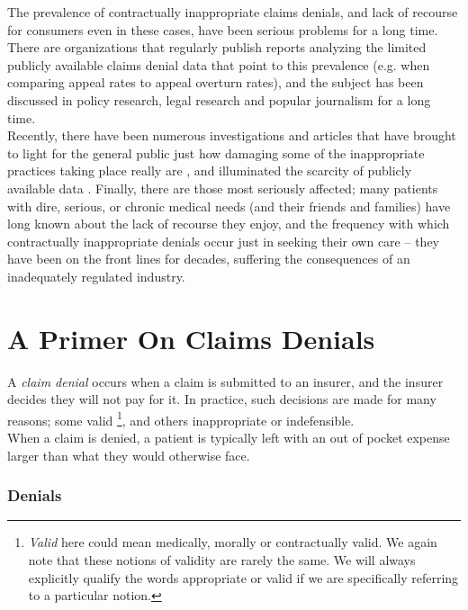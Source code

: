 \documentclass[12pt, a4paper,twoside]{report}
\theoremstyle{plain} %
\theoremstyle{definition} %
\theoremstyle{remark} %
\numberwithin{equation}{chapter}
\begin{document}
		The prevalence of contractually inappropriate claims denials, and lack of recourse for consumers even in these cases, have been serious problems for a long time. There are organizations that regularly publish reports analyzing the limited publicly available claims denial data \cite{pollitz2021} that point to this prevalence (e.g. when comparing appeal rates to appeal overturn rates), and the subject has been discussed in policy research, legal research \cite{fox2022} and popular journalism \cite{konrad2010} for a long time.\\
		
		Recently, there have been numerous investigations and articles that have brought to light for the general public just how damaging some of the inappropriate practices taking place really are \cite{armstrong2023a} \cite{armstrong2023b}, and illuminated the scarcity of publicly available data \cite{fields2023}. Finally, there are those most seriously affected; many patients with dire, serious, or chronic medical needs (and their friends and families) have long known about the lack of recourse they enjoy, and the frequency with which contractually inappropriate denials occur just in seeking their own care -- they have been on the front lines for decades, suffering the consequences of an inadequately regulated industry.\\
		
		
		\chapter{A Primer On Claims Denials}\label{primer}
		
		\hspace{2em} A \emph{claim denial} occurs when a claim is submitted to an insurer, and the insurer decides they will not pay for it. In practice, such decisions are made for many reasons; some valid \footnote{\emph{Valid} here could mean medically, morally or contractually valid. We again note that these notions of validity are rarely the same. We will always explicitly qualify the words appropriate or valid if we are specifically referring to a particular notion.}, and others inappropriate or indefensible.\\
		
		When a claim is denied, a patient is typically left with an out of pocket expense larger than what they would otherwise face.

		\subsection{Denials}
		
\end{document}
